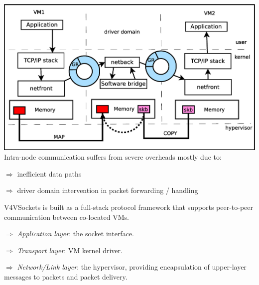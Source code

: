 \documentclass[a0paper,portrait,final]{baposter}
\begin{document}
\begin{poster}
{\begin{multicols}{2}
\includegraphics[width=\linewidth]{figures/netfront_netback.eps}
Intra-node communication suffers from severe overheads mostly due to:

$\Rightarrow$ inefficient data paths

$\Rightarrow$ driver domain intervention in packet forwarding / handling

\hspace{0.5em}
V4VSockets is built as a full-stack protocol framework that supports
peer-to-peer communication between co-located VMs. %

$\Rightarrow$ \emph{Application layer}: the socket interface.

$\Rightarrow$ \emph{Transport layer}: VM kernel driver.

$\Rightarrow$ \emph{Network/Link layer}: the hypervisor, providing encapsulation of upper-layer messages to packets and packet delivery.


\end{multicols}}
\end{poster}
\end{document}
